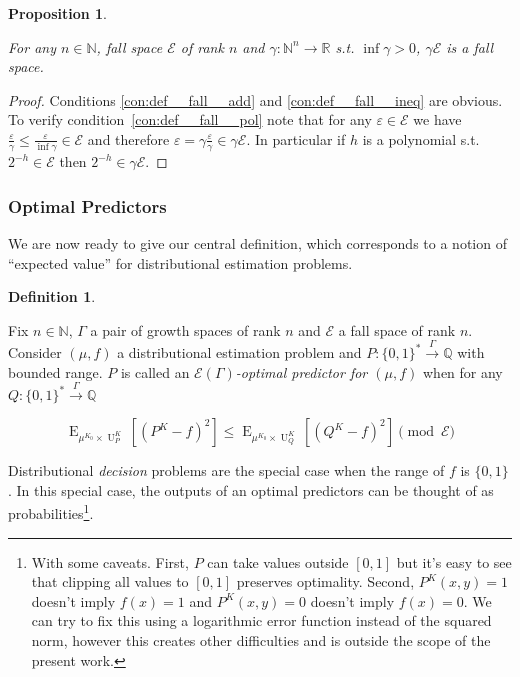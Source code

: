 \documentclass{article}
\numberwithin{equation}{section}
\theoremstyle{definition}
\newtheorem{definition}{Definition}[section]
\theoremstyle{plain}
\newtheorem{proposition}{Proposition}[section]
\newcommand{\Bool}{\{0,1\}}
\newcommand{\Words}{{\Bool^*}}
\DeclareMathOperator{\E}{E}
\DeclareMathOperator{\Un}{U}
\newcommand{\Nats}{\mathbb{N}}
\newcommand{\Rats}{\mathbb{Q}}
\newcommand{\Reals}{\mathbb{R}}
\newcommand{\Fall}{\mathcal{E}}
\newcommand{\EG}{\Fall(\Gamma)}
\newcommand{\Scheme}{\xrightarrow{\Gamma}}
\begin{document}
\begin{samepage}
\begin{proposition}
\label{prp:tbd}

For any $n \in \Nats$, fall space $\Fall$ of rank $n$ and $\gamma: \Nats^n \rightarrow \Reals$ s.t. $\inf \gamma > 0$, $\gamma \Fall$ is a fall space.

\end{proposition}
\end{samepage}

\begin{proof}

Conditions \ref{con:def__fall__add} and \ref{con:def__fall__ineq} are obvious. To verify condition~\ref{con:def__fall__pol} note that for any $\varepsilon \in \Fall$ we have $\frac{\varepsilon}{\gamma} \leq \frac{\varepsilon}{\inf \gamma} \in \Fall$ and therefore $\varepsilon = \gamma \frac{\varepsilon}{\gamma} \in \gamma \Fall$. In particular if $h$ is a polynomial s.t. $2^{-h} \in \Fall$ then $2^{-h} \in \gamma \Fall$.
%
\end{proof}

\subsubsection{Optimal Predictors}

We are now ready to give our central definition, which corresponds to a notion of \enquote{expected value} for distributional estimation problems.

\begin{definition}
\label{def:op}

Fix $n \in \Nats$, $\Gamma$ a pair of growth spaces of rank $n$ and $\Fall$ a fall space of rank $n$. Consider $(\mu,f)$ a distributional estimation problem and $P: \Words \Scheme \Rats$ with bounded range. $P$ is called an \emph{$\EG$-optimal predictor for $(\mu,f)$} when for any $Q: \Words \Scheme \Rats$

\begin{equation}
\label{eqn:op}
\E_{\mu^{K_0} \times \Un_P^K}[(P^K - f)^2] \leq \E_{\mu^{K_0} \times \Un_Q^K}[(Q^K - f)^2] \pmod \Fall
\end{equation}

\end{definition}

Distributional \emph{decision} problems are the special case when the range of $f$ is $\Bool$. In this special case, the outputs of an optimal predictors can be thought of as probabilities\footnote{With some caveats. First, $P$ can take values outside $[0,1]$ but it's easy to see that clipping all values to $[0,1]$ preserves optimality. Second, $P^{K}(x,y)=1$ doesn't imply $f(x) = 1$ and $P^{K}(x,y)=0$ doesn't imply $f(x)=0$. We can try to fix this using a logarithmic error function instead of the squared norm, however this creates other difficulties and is outside the scope of the present work.}.
\end{document}
